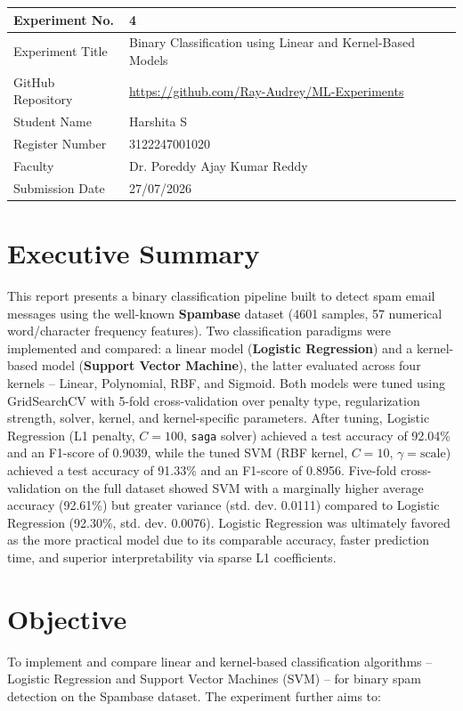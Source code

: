 \documentclass[12pt,a4paper]{article}
\begin{document}
\begin{tabular}{|p{4cm}|p{11cm}|}
\hline
Experiment No. & 4 \\ \hline
Experiment Title & Binary Classification using Linear and Kernel-Based Models \\ \hline
GitHub Repository & \url{https://github.com/Ray-Audrey/ML-Experiments} \\ \hline
Student Name & Harshita S \\ \hline
Register Number & 3122247001020 \\ \hline
Faculty & Dr. Poreddy Ajay Kumar Reddy \\ \hline
Submission Date & 27/07/2026 \\ \hline
\end{tabular}

\section{Executive Summary}

This report presents a binary classification pipeline built to detect spam email messages using the well-known \textbf{Spambase} dataset (4601 samples, 57 numerical word/character frequency features). Two classification paradigms were implemented and compared: a linear model (\textbf{Logistic Regression}) and a kernel-based model (\textbf{Support Vector Machine}), the latter evaluated across four kernels -- Linear, Polynomial, RBF, and Sigmoid. Both models were tuned using GridSearchCV with 5-fold cross-validation over penalty type, regularization strength, solver, kernel, and kernel-specific parameters. After tuning, Logistic Regression (L1 penalty, $C=100$, \texttt{saga} solver) achieved a test accuracy of 92.04\% and an F1-score of 0.9039, while the tuned SVM (RBF kernel, $C=10$, $\gamma=\text{scale}$) achieved a test accuracy of 91.33\% and an F1-score of 0.8956. Five-fold cross-validation on the full dataset showed SVM with a marginally higher average accuracy (92.61\%) but greater variance (std. dev. 0.0111) compared to Logistic Regression (92.30\%, std. dev. 0.0076). Logistic Regression was ultimately favored as the more practical model due to its comparable accuracy, faster prediction time, and superior interpretability via sparse L1 coefficients.

\section{Objective}

To implement and compare linear and kernel-based classification algorithms -- Logistic Regression and Support Vector Machines (SVM) -- for binary spam detection on the Spambase dataset. The experiment further aims to:
\end{document}
